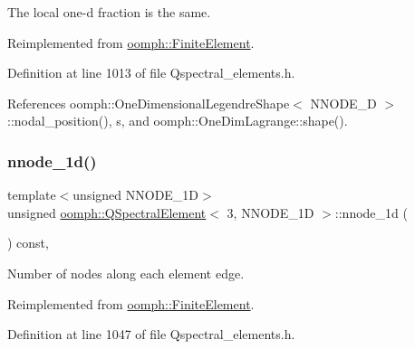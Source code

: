 The local one-\/d fraction is the same. 



Reimplemented from \hyperlink{classoomph_1_1FiniteElement_adb8ec7d2ceda37528c2d4542d572edf4}{oomph\+::\+Finite\+Element}.



Definition at line 1013 of file Qspectral\+\_\+elements.\+h.



References oomph\+::\+One\+Dimensional\+Legendre\+Shape$<$ N\+N\+O\+D\+E\+\_\+D $>$\+::nodal\+\_\+position(), s, and oomph\+::\+One\+Dim\+Lagrange\+::shape().

\mbox{\label{classoomph_1_1QSpectralElement_3_013_00_01NNODE__1D_01_4_aed7979fbbf90426cfc18afcfdc12b6d8}} 
\subsubsection{\texorpdfstring{nnode\+\_\+1d()}{nnode\_1d()}}
{\footnotesize\ttfamily template$<$unsigned N\+N\+O\+D\+E\+\_\+1D$>$ \\
unsigned \hyperlink{classoomph_1_1QSpectralElement}{oomph\+::\+Q\+Spectral\+Element}$<$ 3, N\+N\+O\+D\+E\+\_\+1D $>$\+::nnode\+\_\+1d (\begin{DoxyParamCaption}{ }\end{DoxyParamCaption}) const\hspace{0.3cm}{\ttfamily [inline]}, {\ttfamily [virtual]}}



Number of nodes along each element edge. 



Reimplemented from \hyperlink{classoomph_1_1FiniteElement_ab65c7a94dda80c1876a09ac12be4e39c}{oomph\+::\+Finite\+Element}.



Definition at line 1047 of file Qspectral\+\_\+elements.\+h.

\mbox{\label{classoomph_1_1QSpectralElement_3_013_00_01NNODE__1D_01_4_afc859729c1090d442025b866c0fcb781}} 
